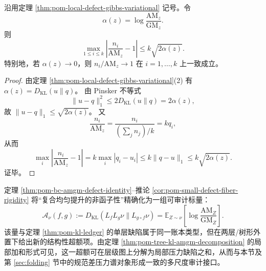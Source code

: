 \begin{corollary}\label{cor:pom-small-defect-fiber-rigidity}
沿用定理 \ref{thm:pom-local-defect-gibbs-variational} 记号。令
\[
\alpha(z)=\log\frac{\mathrm{AM}_z}{\mathrm{GM}_z}.
\]
则
\[
\boxed{\;
\max_{1\le i\le k}\left|\frac{n_i}{\mathrm{AM}_z}-1\right|
\le k\sqrt{2\alpha(z)}.
\;}
\]
特别地，若 \(\alpha(z)\to 0\)，则 \(n_i/\mathrm{AM}_z\to 1\) 在 \(i=1,\dots,k\) 上一致成立。
\end{corollary}
\begin{proof}
由定理 \ref{thm:pom-local-defect-gibbs-variational}(2) 有 \(\alpha(z)=D_{\mathrm{KL}}(u\|q)\)。
由 Pinsker 不等式
\[
\|u-q\|_1^2\le 2D_{\mathrm{KL}}(u\|q)=2\alpha(z),
\]
故 \(\|u-q\|_1\le \sqrt{2\alpha(z)}\)。
又
\[
\frac{n_i}{\mathrm{AM}_z}
=\frac{n_i}{(\sum_j n_j)/k}
=kq_i,
\]
从而
\[
\max_i\left|\frac{n_i}{\mathrm{AM}_z}-1\right|
=k\max_i|q_i-u_i|
\le k\|q-u\|_1
\le k\sqrt{2\alpha(z)}.
\]
证毕。
\end{proof}

\begin{remark}[与规范差压力谱接口的对应关系]\label{rem:pom-bc-gauge-pressure-interface}
定理 \ref{thm:pom-bc-amgm-defect-identity}--推论 \ref{cor:pom-small-defect-fiber-rigidity} 将“复合均匀提升的非函子性”精确化为一组可审计标量：
\[
\mathcal A_{\nu}(f,g):=D_{\mathrm{KL}}(L_fL_g\nu\|L_{g\circ f}\nu)
=\mathbb E_{Z\sim\nu}\!\left[\log\frac{\mathrm{AM}_Z}{\mathrm{GM}_Z}\right].
\]
该量与定理 \ref{thm:pom-kl-ledger} 的单层缺陷属于同一账本类型，但在两层/树形外置下给出新的结构性超额项。由定理 \ref{thm:pom-tree-kl-amgm-decomposition} 的局部加和形式可见，这一超额可在层级图上分解为局部压力缺陷之和，从而与本节及第 \ref{sec:folding} 节中的规范差压力谱对象形成一致的多尺度审计接口。
\end{remark}

